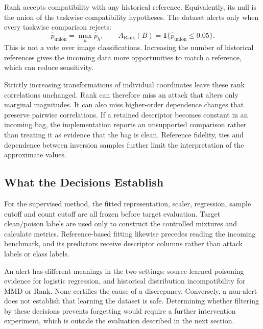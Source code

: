 Rank accepts compatibility with any historical reference. Equivalently,
its null is the union of the taskwise compatibility hypotheses. The dataset
alerts only when every taskwise comparison rejects:
\begin{equation}
    \widehat{p}_{\mathrm{union}}=\max_h\widehat{p}_h,
    \qquad
    A_{\mathrm{Rank}}(B)=
       \mathbf{1}\{\widehat{p}_{\mathrm{union}}\leq 0.05\}.
    \label{eq:methods-rank-union}
\end{equation}
This is not a vote over image classifications. Increasing the number of
historical references gives the incoming data more opportunities to match
a reference, which can reduce sensitivity.

Strictly increasing transformations of individual coordinates leave these
rank correlations unchanged. Rank can therefore miss an attack that alters
only marginal magnitudes. It can also miss higher-order dependence changes
that preserve pairwise correlations. If a retained descriptor becomes
constant in an incoming bag, the implementation reports an unsupported
comparison rather than treating it as evidence that the bag is clean.
Reference fidelity, ties and dependence between inversion samples further
limit the interpretation of the approximate values.

\subsection{What the Decisions Establish}
\label{subsec:methods-interpretation}

For the supervised method, the fitted representation, scaler, regression,
sample cutoff and count cutoff are all frozen before target evaluation.
Target clean/poison labels are used only to construct the controlled
mixtures and calculate metrics. Reference-based fitting likewise precedes
reading the incoming benchmark, and its predictors receive descriptor
columns rather than attack labels or class labels.

An alert has different meanings in the two settings: source-learned
poisoning evidence for logistic regression, and historical distribution
incompatibility for MMD or Rank. None certifies the cause of a discrepancy.
Conversely, a non-alert does not establish that learning the dataset is
safe. Determining whether filtering by these decisions prevents forgetting
would require a further intervention experiment, which is outside the
evaluation described in the next section.
